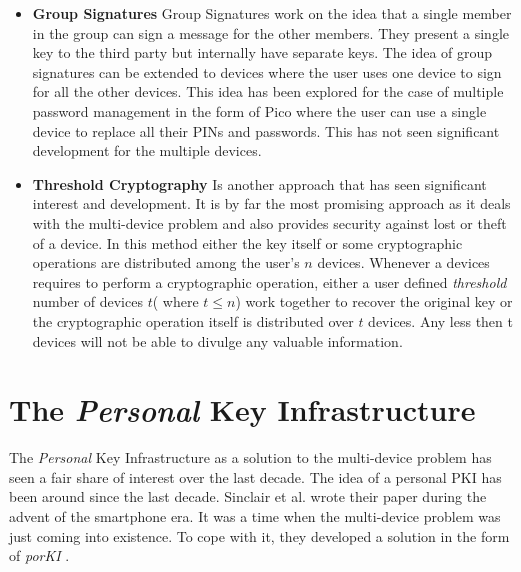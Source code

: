 \begin{itemize}
	\item \textbf{Group Signatures} Group Signatures work on the idea that a single member in the group can sign a message for the other 					members. They present a single key to the third party but internally have separate keys\cite{Bellare2003}. The idea of group signatures can be 	extended to devices where the user uses one device to sign for all the other devices. This idea has been explored for the case of multiple 				password management in the form of Pico\cite{Stajano2011} where the user can use a single device to replace all their PINs and passwords. 			This has not seen significant development for the multiple devices. \\

	\item \textbf{Threshold Cryptography} Is another approach that has seen significant interest and development. It is by far the most promising 		approach as it deals with the multi-device problem and also provides security against lost or theft of a device\cite{Desmedt2001}. In this 				method either the key itself or some cryptographic operations are distributed among the user's $n$ devices\cite{Desmedt1994}. Whenever a 		devices requires to perform a cryptographic operation, either a user defined \emph{threshold} number of devices $t$( where $t \leqslant n$) 		work together to recover the original key or the cryptographic operation itself is distributed over $t$ devices. Any less then t devices will not 		be able to divulge any valuable information.

\end{itemize}



\section{The \emph{Personal} Key Infrastructure}

The \textit{Personal} Key Infrastructure as a solution to the multi-device problem has seen a fair share of interest over the last decade. The idea of a personal PKI has been around since the last decade. Sinclair et al. wrote their paper during the advent of the smartphone era. It was a time when the multi-device problem was just coming into existence. To cope with it, they developed a solution in the form of \textit{porKI} \cite{Sinclair2005}.

